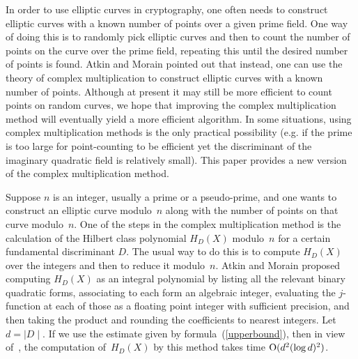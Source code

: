 \documentclass{amsart}
\newcommand{\Mid}{\mid\!\!}
\newcommand{\miD}{\!\!\mid}
\newcommand{\bigo}{{\rm O}}
\newcommand{\edit}[1]{\footnote{#1}\marginpar{\hfill {\sf\thefootnote}}}
\theoremstyle{plain}
\begin{document}
In order to use elliptic curves in cryptography, one often needs to construct
elliptic curves with a known number of points over a given 
prime field. One way of doing this is to randomly pick elliptic curves and
then to count the number of points on the curve over the prime field, 
repeating this until the desired number of points is found.
Atkin and Morain \cite{atmor} pointed out that instead, one can use the theory of complex 
multiplication to construct elliptic curves with a known number of points.
Although at present it may still be more efficient to count
points on random curves, we hope that improving the complex multiplication
method will eventually yield a more efficient algorithm.  In some 
situations, using complex multiplication methods is the only practical
possibility (e.g. if the prime is too large for point-counting to be
efficient yet the discriminant of the imaginary quadratic field is
relatively small).
This paper provides a new version of the complex multiplication method.

Suppose $n$ is an integer, usually a prime or a pseudo-prime,
and one wants to construct an elliptic curve modulo~$n$ along with the 
number of points on that curve modulo~$n$. 
One of the steps in the complex multiplication method 
is the calculation of the Hilbert class polynomial 
$H_D(X)$ modulo~$n$ for a certain fundamental discriminant $D$. 
The usual way to do this is to compute 
$H_D(X)$ over the integers and then to reduce it modulo~$n$.
Atkin and Morain proposed computing $H_D(X)$ as an integral polynomial 
by listing all the relevant binary quadratic forms, associating to each form an
algebraic integer, evaluating the
$j$-function at each of those as a floating point integer with sufficient precision, 
and then taking the product and rounding the coefficients to nearest
integers. Let $d = \Mid D \miD$.
If we use the estimate given by formula~(\ref{upperbound}),
then in view of~\cite[\S5.10]{ll}, the
computation of~$H_D(X)$ by this method takes time $\bigo(d^2 (\log d)^2)$.
\end{document}

